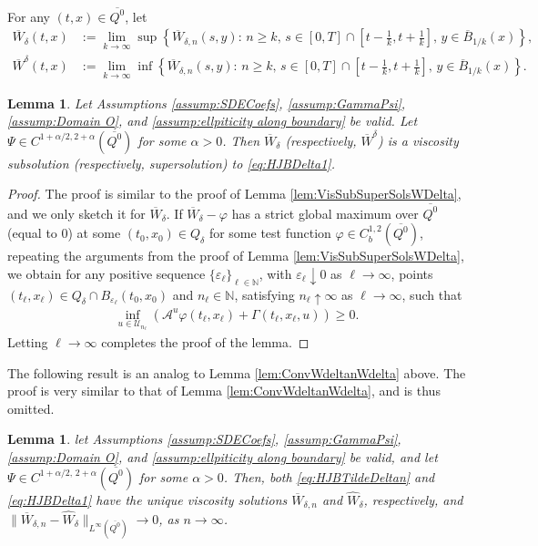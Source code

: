 \documentclass[amscd,amssymb,11pt]{article}
\newtheorem{lemma}[theorem]{Lemma}
\numberwithin{theorem}{section}
\numberwithin{equation}{section}
\begin{document}
\smallskip
For any $(t,x)\in \overline{Q^{0}}$, let
\begin{align*}
\overline{W}_{\delta}(t,x)&:=\lim_{k\rightarrow\infty}\sup\left\{\overline{W}_{\delta,n}(s,y):\,n\geq k,\,s\in[0,T]\cap\left[t-\frac{1}{k},t+\frac{1}{k}\right],\,y\in\overline{B}_{1/k}(x)\right\},\\
\overline{W}^{\delta}(t,x)&:=\lim_{k\rightarrow\infty}\inf\left\{\overline{W}_{\delta,n}(s,y):\,n\geq k,\,s\in[0,T]\cap\left[t-\frac{1}{k},t+\frac{1}{k}\right],\,y\in\overline{B}_{1/k}(x)\right\}.
\end{align*}
\begin{lemma}\label{lem:VisSubSuperSolsOverlineWDelta}
Let Assumptions \ref{assump:SDECoefs}, \ref{assump:GammaPsi}, \ref{assump:Domain O}, and \ref{assump:ellpiticity along boundary} be valid. Let $\Psi\in C^{1+\alpha/2,2+\alpha}(\overline{Q^{0}})$ for some $\alpha>0$. Then $\overline{W}_{\delta}$ (respectively, $\overline{W}^{\delta}$) is a viscosity subsolution (respectively, supersolution) to \eqref{eq:HJBDelta1}.
\end{lemma}
\begin{proof}
The proof is similar to the proof of Lemma \ref{lem:VisSubSuperSolsWDelta}, and we only sketch it for $\overline{W}_{\delta}$. If $\overline{W}_{\delta}-\varphi$ has a strict global maximum over $\overline {Q^{0}}$ (equal to $0$) at some $(t_{0},x_{0})\in Q_{\delta}$ for some test function $\varphi\in C_{b}^{1,2}(\overline{Q^{0}})$, repeating the arguments from the proof of Lemma \ref{lem:VisSubSuperSolsWDelta}, we obtain for any positive sequence $\{\varepsilon_{\ell}\}_{\ell\in\mathbb{N}}$, with $\varepsilon_{\ell}\downarrow 0$ as $\ell\rightarrow\infty$, points $(t_{\ell},x_{\ell})\in Q_\delta\cap B_{\varepsilon_{\ell}}(t_{0},x_{0})$ and $n_{\ell}\in\mathbb{N}$, satisfying $n_{\ell}\uparrow\infty$ as $\ell\rightarrow\infty$, such that
\begin{align*}
\inf_{u\in\mathcal{U}_{n_{\ell}}}\left(\mathscr{A}^{u}\varphi(t_{\ell},x_{\ell})+\Gamma(t_{\ell},x_{\ell},u)\right)\geq 0.
\end{align*}
Letting $\ell\rightarrow\infty$ completes the proof of the lemma.
\end{proof}

The following result is an analog to Lemma \ref{lem:ConvWdeltanWdelta} above. The proof is very similar to that of Lemma \ref{lem:ConvWdeltanWdelta}, and is thus omitted.
\begin{lemma}\label{lem:ConvOverlineWdeltanWdelta}
let Assumptions \ref{assump:SDECoefs}, \ref{assump:GammaPsi}, \ref{assump:Domain O}, and \ref{assump:ellpiticity along boundary} be valid, and let $\Psi\in C^{1+\alpha/2,\,2+\alpha}(\overline{Q^{0}})$ for some $\alpha>0$. Then, both \eqref{eq:HJBTildeDeltan} and \eqref{eq:HJBDelta1} have the unique viscosity solutions $\overline{W}_{\delta,n}$ and $\widehat W_{\delta}$, respectively, and $\|\overline{W}_{\delta,n}-\widehat{W}_{\delta}\|_{L^{\infty}(\overline{Q^{0}})}\rightarrow 0$, as $n\rightarrow\infty$.
\end{lemma}
\end{document}
